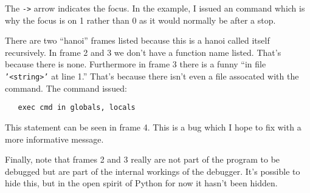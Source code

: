 The {\tt->} arrow indicates the focus. In the example, I issued an
 command which is why the focus is on 1 rather than 0 as it
would normally be after a stop.

There are two ``hanoi'' frames listed because this is a hanoi called
itself recursively. In frame 2 and 3 we don't have a function name
listed. That's because there is none. Furthermore in frame 3 there is
a funny ``in file {\tt '<string>'} at line 1.'' That's because there
isn't even a file assocated with the command. The command issued:

\begin{verbatim}
   exec cmd in globals, locals
\end{verbatim}

This statement can be seen in frame 4. This is a bug which I hope to
fix with a more informative message.

Finally, note that frames 2 and 3 really are not part of the
program to be debugged but are part of the internal workings of the
debugger. It's possible to hide this, but in the open spirit of Python
for now it hasn't been hidden.

